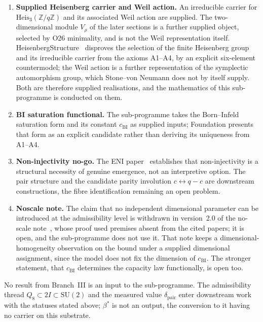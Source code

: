 \documentclass[11pt,a4paper]{article}
\theoremstyle{definition}
\newcommand{\Heis}{\mathrm{Heis}}
\newcommand{\SU}{\mathrm{SU}}
\newcommand{\dimpair}{\delta_{\mathrm{pair}}}
\newcommand{\betastar}{\beta^*}
\newcommand{\cchi}{c_{\mathrm{BI}}}
\begin{document}
    \begin{enumerate}
      \item \textbf{Supplied Heisenberg carrier and Weil action.}
      An irreducible carrier for $\Heis_3(\mathbb{Z}/q\mathbb{Z})$ and its associated Weil action
      are supplied.
      The two-dimensional module $V_\rho$ of the later sections is a further supplied object,
      selected by O26 minimality, and is not the Weil representation itself.
      HeisenbergStructure~\cite{Beau2026HeisenbergStructure} disproves the selection of the finite
      Heisenberg group and its irreducible carrier from the axioms A1--A4, by an explicit
      six-element countermodel; the Weil action is a further representation of the symplectic
      automorphism group, which Stone--von Neumann does not by itself supply.
      Both are therefore supplied realisations, and the mathematics of this sub-programme is
      conducted on them.

      \item \textbf{BI saturation functional.}
      The sub-programme takes the Born--Infeld saturation form and its constant $\cchi$ as supplied
      inputs; Foundation presents that form as an explicit candidate rather than deriving its
      uniqueness from A1--A4.

      \item \textbf{Non-injectivity no-go.}
      The ENI paper~\cite{Beau2026l} establishes that non-injectivity is a structural necessity
      of genuine emergence, not an interpretive option.
      The pair structure and the candidate parity involution $c \leftrightarrow q - c$ are
      downstream constructions, the fibre identification remaining an open problem.

      \item \textbf{Noscale note.}
      The claim that no independent dimensional parameter can be introduced at the admissibility
      level is withdrawn in version~2.0 of the no-scale note~\cite{Beau2026j}, whose proof used premises
      absent from the cited papers; it is open, and the sub-programme does not use it.
      That note keeps a dimensional-homogeneity observation on the bound under a supplied dimensional
      assignment, since the model does not fix the dimension of $\cchi$.
      The stronger statement, that $\cchi$ determines the capacity law functionally, is open too.
    \end{enumerate}

    \noindent No result from Branch~III is an input to the sub-programme.
    The admissibility thread $Q_8 \subset 2I \subset \SU(2)$ and the measured value $\dimpair$
    enter downstream work with the statuses stated above; $\betastar$ is not an output, the
    conversion to it having no carrier on this substrate.
\end{document}

